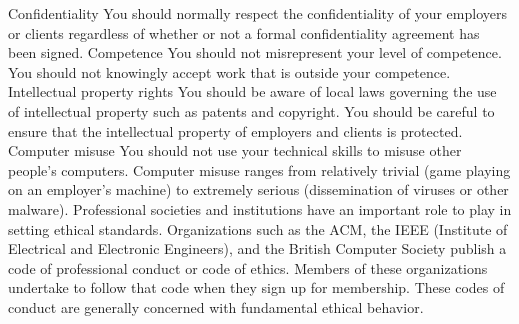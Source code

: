 \documentclass[twoside]{article}
\begin{document}
\begin{multicols}{2}
Confidentiality You should normally respect the confidentiality of your
employers or clients regardless of whether or not a formal confidentiality
agreement has been signed. Competence You should not misrepresent your level of
competence. You should not knowingly accept work that is outside your
competence. Intellectual property rights You should be aware of local laws
governing the use of intellectual property such as patents and copyright. You
should be careful to ensure that the intellectual property of employers and
clients is protected. Computer misuse You should not use your technical skills
to misuse other people's computers. Computer misuse ranges from relatively
trivial (game playing on an employer's machine) to extremely serious
(dissemination of viruses or other malware). Professional societies and
institutions have an important role to play in setting ethical standards.
Organizations such as the ACM, the IEEE (Institute of Electrical and Electronic
Engineers), and the British Computer Society publish a code of professional
conduct or code of ethics. Members of these organizations undertake to follow
that code when they sign up for membership. These codes of conduct are generally
concerned with fundamental ethical behavior.

\pagebreak
 


\end{multicols}
\end{document}
